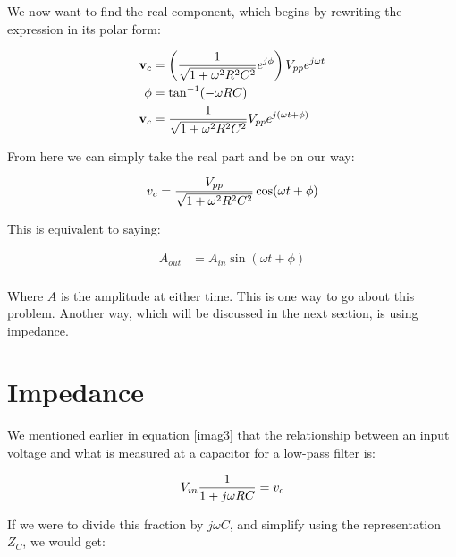 We now want to find the real component, which begins by rewriting the expression in its polar form: 

\begin{equation} \label{imag4}
\begin{split}
\textbf{v}_c &= \left(\frac{1}{\sqrt{1 + \omega^2 R^2C^2}}e^{j\phi}\right){ V}_{ pp} e^{j\omega t} \\
\phi &= \tan^{-1}(-\omega RC) \\
\textbf{v}_c &= \frac{1}{\sqrt{1 + \omega^2 R^2C^2}}{ V}_{ pp} e^{j(\omega t + \phi)} \\
\end{split}
\end{equation}

From here we can simply take the real part and be on our way:

\begin{equation} \label{imag5}
\begin{split}
v_c &= \frac{{ V}_{ pp}}{\sqrt{1 + \omega^2 R^2C^2}} \cos(\omega t + \phi) \\
\end{split}
\end{equation}

This is equivalent to saying:

\begin{equation} \label{imag5}
\begin{split}
A_{out} &= A_{in}\sin(\omega t + \phi) \\
\end{split}
\end{equation}

Where $A$ is the amplitude at either time. This is one way to go about this problem. Another way, which will be discussed in the next section, is using impedance. 

\section{Impedance}
We mentioned earlier in equation \eqref{imag3} that the relationship between an input voltage and what is measured at a capacitor for a low-pass filter is: 

\begin{equation} \label{imp1}
\begin{split}
{V}_{in} \frac{1}{1+j\omega RC} = v_c
\end{split}
\end{equation}

If we were to divide this fraction by $j\omega C$, and simplify using the representation $Z_C$, we would get: 

